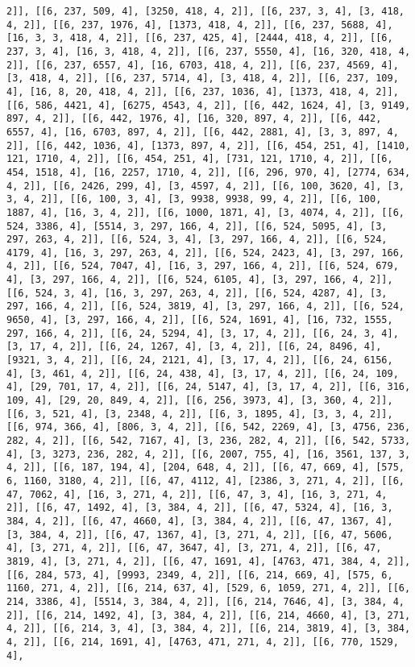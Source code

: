 \documentclass[12pt,fleqn]{article}\usepackage{../../common}
\begin{document}
\begin{verbatim}
2]], [[6, 237, 509, 4], [3250, 418, 4, 2]], [[6, 237, 3, 4], [3, 418, 4, 2]], [[6, 237, 1976, 4], [1373, 418, 4, 2]], [[6, 237, 5688, 4], [16, 3, 3, 418, 4, 2]], [[6, 237, 425, 4], [2444, 418, 4, 2]], [[6, 237, 3, 4], [16, 3, 418, 4, 2]], [[6, 237, 5550, 4], [16, 320, 418, 4, 2]], [[6, 237, 6557, 4], [16, 6703, 418, 4, 2]], [[6, 237, 4569, 4], [3, 418, 4, 2]], [[6, 237, 5714, 4], [3, 418, 4, 2]], [[6, 237, 109, 4], [16, 8, 20, 418, 4, 2]], [[6, 237, 1036, 4], [1373, 418, 4, 2]], [[6, 586, 4421, 4], [6275, 4543, 4, 2]], [[6, 442, 1624, 4], [3, 9149, 897, 4, 2]], [[6, 442, 1976, 4], [16, 320, 897, 4, 2]], [[6, 442, 6557, 4], [16, 6703, 897, 4, 2]], [[6, 442, 2881, 4], [3, 3, 897, 4, 2]], [[6, 442, 1036, 4], [1373, 897, 4, 2]], [[6, 454, 251, 4], [1410, 121, 1710, 4, 2]], [[6, 454, 251, 4], [731, 121, 1710, 4, 2]], [[6, 454, 1518, 4], [16, 2257, 1710, 4, 2]], [[6, 296, 970, 4], [2774, 634, 4, 2]], [[6, 2426, 299, 4], [3, 4597, 4, 2]], [[6, 100, 3620, 4], [3, 3, 4, 2]], [[6, 100, 3, 4], [3, 9938, 9938, 99, 4, 2]], [[6, 100, 1887, 4], [16, 3, 4, 2]], [[6, 1000, 1871, 4], [3, 4074, 4, 2]], [[6, 524, 3386, 4], [5514, 3, 297, 166, 4, 2]], [[6, 524, 5095, 4], [3, 297, 263, 4, 2]], [[6, 524, 3, 4], [3, 297, 166, 4, 2]], [[6, 524, 4179, 4], [16, 3, 297, 263, 4, 2]], [[6, 524, 2423, 4], [3, 297, 166, 4, 2]], [[6, 524, 7047, 4], [16, 3, 297, 166, 4, 2]], [[6, 524, 679, 4], [3, 297, 166, 4, 2]], [[6, 524, 6105, 4], [3, 297, 166, 4, 2]], [[6, 524, 3, 4], [16, 3, 297, 263, 4, 2]], [[6, 524, 4287, 4], [3, 297, 166, 4, 2]], [[6, 524, 3819, 4], [3, 297, 166, 4, 2]], [[6, 524, 9650, 4], [3, 297, 166, 4, 2]], [[6, 524, 1691, 4], [16, 732, 1555, 297, 166, 4, 2]], [[6, 24, 5294, 4], [3, 17, 4, 2]], [[6, 24, 3, 4], [3, 17, 4, 2]], [[6, 24, 1267, 4], [3, 4, 2]], [[6, 24, 8496, 4], [9321, 3, 4, 2]], [[6, 24, 2121, 4], [3, 17, 4, 2]], [[6, 24, 6156, 4], [3, 461, 4, 2]], [[6, 24, 438, 4], [3, 17, 4, 2]], [[6, 24, 109, 4], [29, 701, 17, 4, 2]], [[6, 24, 5147, 4], [3, 17, 4, 2]], [[6, 316, 109, 4], [29, 20, 849, 4, 2]], [[6, 256, 3973, 4], [3, 360, 4, 2]], [[6, 3, 521, 4], [3, 2348, 4, 2]], [[6, 3, 1895, 4], [3, 3, 4, 2]], [[6, 974, 366, 4], [806, 3, 4, 2]], [[6, 542, 2269, 4], [3, 4756, 236, 282, 4, 2]], [[6, 542, 7167, 4], [3, 236, 282, 4, 2]], [[6, 542, 5733, 4], [3, 3273, 236, 282, 4, 2]], [[6, 2007, 755, 4], [16, 3561, 137, 3, 4, 2]], [[6, 187, 194, 4], [204, 648, 4, 2]], [[6, 47, 669, 4], [575, 6, 1160, 3180, 4, 2]], [[6, 47, 4112, 4], [2386, 3, 271, 4, 2]], [[6, 47, 7062, 4], [16, 3, 271, 4, 2]], [[6, 47, 3, 4], [16, 3, 271, 4, 2]], [[6, 47, 1492, 4], [3, 384, 4, 2]], [[6, 47, 5324, 4], [16, 3, 384, 4, 2]], [[6, 47, 4660, 4], [3, 384, 4, 2]], [[6, 47, 1367, 4], [3, 384, 4, 2]], [[6, 47, 1367, 4], [3, 271, 4, 2]], [[6, 47, 5606, 4], [3, 271, 4, 2]], [[6, 47, 3647, 4], [3, 271, 4, 2]], [[6, 47, 3819, 4], [3, 271, 4, 2]], [[6, 47, 1691, 4], [4763, 471, 384, 4, 2]], [[6, 284, 573, 4], [9993, 2349, 4, 2]], [[6, 214, 669, 4], [575, 6, 1160, 271, 4, 2]], [[6, 214, 637, 4], [529, 6, 1059, 271, 4, 2]], [[6, 214, 3386, 4], [5514, 3, 384, 4, 2]], [[6, 214, 7646, 4], [3, 384, 4, 2]], [[6, 214, 1492, 4], [3, 384, 4, 2]], [[6, 214, 4660, 4], [3, 271, 4, 2]], [[6, 214, 3, 4], [3, 384, 4, 2]], [[6, 214, 3819, 4], [3, 384, 4, 2]], [[6, 214, 1691, 4], [4763, 471, 271, 4, 2]], [[6, 770, 1529, 4], 
\end{verbatim}
\end{document}
